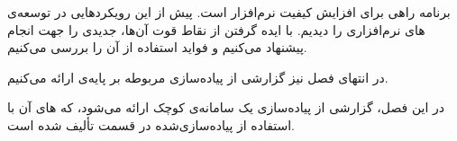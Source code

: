 
 برنامه راهی برای افزایش کیفیت نرم‌افزار است. پیش از این رویکردهایی در توسعه‌ی های نرم‌افزاری را دیدیم. با ایده گرفتن از نقاط قوت آن‌ها،   جدیدی را جهت انجام  پیشنهاد می‌کنیم و فواید استفاده از آن را بررسی می‌کنیم.

در انتهای فصل نیز گزارشی از پیاده‌سازی  مربوطه بر پایه‌ی  ارائه می‌کنیم.










در این فصل، گزارشی از پیاده‌سازی یک سامانه‌ی کوچک ارائه می‌شود، که ‌های آن با استفاده از  پیاده‌سازی‌شده در قسمت  تألیف شده است.




